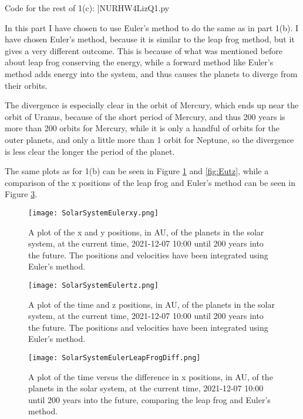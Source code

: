 Code for the rest of 1(c):
]{NURHW4LizQ1.py}

In this part I have chosen to use Euler's method to do the same as in part 1(b).
I have chosen Euler's method, because it is similar to the leap frog method, but it gives a very different outcome.
This is because of what was mentioned before about leap frog conserving the energy, while a forward method like Euler's method adds energy into the system, and thus causes the planets to diverge from their orbits.

The divergence is especially clear in the orbit of Mercury, which ends up near the orbit of Uranus, because of the short period of Mercury, and thus 200 years is more than 200 orbits for Mercury, while it is only a handful of orbits for the outer planets, and only a little more than 1 orbit for Neptune, so the divergence is less clear the longer the period of the planet.

The same plots as for 1(b) can be seen in Figure \ref{fig:Euxy} and \ref{fig:Eutz}, while a comparison of the x positions of the leap frog and Euler's method can be seen in Figure \ref{fig:LFEdiff}.

\begin{figure}[ht!]
  \centering
  \texttt{[image: SolarSystemEulerxy.png]}
  \caption{A plot of the x and y positions, in AU, of the planets in the solar system, at the current time, 2021-12-07 10:00 until 200 years into the future. The positions and velocities have been integrated using Euler's method.}
  \label{fig:Euxy}
\end{figure}

\begin{figure}[ht!]
  \centering
  \texttt{[image: SolarSystemEulertz.png]}
  \caption{A plot of the time and z positions, in AU, of the planets in the solar system, at the current time, 2021-12-07 10:00 until 200 years into the future. The positions and velocities have been integrated using Euler's method.}
  \label{fig:Euxz}
\end{figure}

\begin{figure}[ht!]
  \centering
  \texttt{[image: SolarSystemEulerLeapFrogDiff.png]}
  \caption{A plot of the time versus the difference in x positions, in AU, of the planets in the solar system, at the current time, 2021-12-07 10:00 until 200 years into the future, comparing the leap frog and Euler's method.}
  \label{fig:LFEdiff}
\end{figure}






